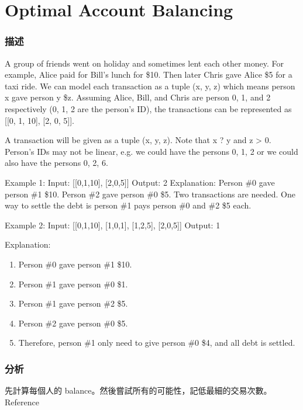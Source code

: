 \section{Optimal Account Balancing} %
\label{sec:optimal-account-balancing}


\subsubsection{描述}
A group of friends went on holiday and sometimes lent each other money.
For example, Alice paid for Bill's lunch for \$10.
Then later Chris gave Alice \$5 for a taxi ride.
We can model each transaction as a tuple (x, y, z) which means person x gave person y \$z.
Assuming Alice, Bill, and Chris are person 0, 1, and 2 respectively (0, 1, 2 are the person's ID),
the transactions can be represented as [[0, 1, 10], [2, 0, 5]].

A transaction will be given as a tuple (x, y, z). Note that x ? y and z > 0.
Person's IDs may not be linear, e.g. we could have the persons 0, 1, 2 or we could also have the persons 0, 2, 6.

Example 1: \newline
Input:
[[0,1,10], [2,0,5]]
Output:
2
Explanation:
Person \#0 gave person \#1 \$10.
Person \#2 gave person \#0 \$5.
Two transactions are needed. One way to settle the debt is person \#1 pays person \#0 and \#2 \$5 each.

Example 2: \newline
Input:
[[0,1,10], [1,0,1], [1,2,5], [2,0,5]]
Output:
1

Explanation:
\begin{enumerate}
    \item Person \#0 gave person \#1 \$10.
    \item Person \#1 gave person \#0 \$1.
    \item Person \#1 gave person \#2 \$5.
    \item Person \#2 gave person \#0 \$5.
    \item Therefore, person \#1 only need to give person \#0 \$4, and all debt is settled.
\end{enumerate}

\subsubsection{分析}
先計算每個人的 balance。然後嘗試所有的可能性，記低最細的交易次數。
Reference 


